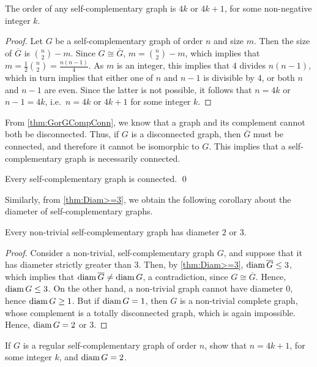 \begin{Theorem}\label{thm:SCOrder}
The order of any self-complementary graph is $4k$ or $4k + 1$, for some non-negative integer $k$.
\end{Theorem}

\begin{proof}
Let $G$ be a self-complementary graph of order $n$ and size $m$. Then the size of $\overline G$ is $\binom n 2 - m$. Since $G \cong \overline G$, $m = \binom n 2 - m$, which implies that $m = \frac 1 2 \binom n 2 = \frac {n(n - 1)}{4}$. As $m$ is an integer, this implies that $4$ divides $n(n - 1)$, which in turn implies that either one of $n$ and $n - 1$ is divisible by $4$, or both $n$ and $n - 1$ are even. Since the latter is not possible, it follows that $n = 4k$ or $n - 1 = 4k$, i.e.\ $n = 4k$ or $4k + 1$ for some integer $k$.
\end{proof}

From \cref{thm:GorGCompConn}, we know that a graph and its complement cannot both be disconnected. Thus, if $G$ is a disconnected graph, then $\overline G$ must be connected, and therefore it cannot be isomorphic to $G$. This implies that a self-complementary graph is necessarily connected.

\begin{Corollary}\label{cor:SCConn}
Every self-complementary graph is connected. \qed
\end{Corollary}

Similarly, from \cref{thm:Diam>=3}, we obtain the following corollary about the diameter of self-complementary graphs.

\begin{Corollary}
Every non-trivial self-complementary graph has diameter $2$ or $3$.
\end{Corollary}

\begin{proof}
Consider a non-trivial, self-complementary graph $G$, and suppose that it has diameter strictly greater than $3$. Then, by \cref{thm:Diam>=3}, $\operatorname{diam} \overline G \le 3$, which implies that $\operatorname{diam} \overline G \ne \operatorname{diam} G$, a contradiction, since $G \cong \overline G$. Hence, $\operatorname{diam} G \le 3$. On the other hand, a non-trivial graph cannot have diameter $0$, hence $\operatorname{diam} G \ge 1$. But if $\operatorname{diam} G = 1$, then $G$ is a non-trivial complete graph, whose complement is a totally disconnected graph, which is again impossible. Hence, $\operatorname{diam} G = 2$ or $3$.
\end{proof}

\begin{Exercise}
If $G$ is a regular self-complementary graph of order $n$, show that $n = 4k + 1$, for some integer $k$, and $\operatorname{diam} G = 2$.
\end{Exercise}

